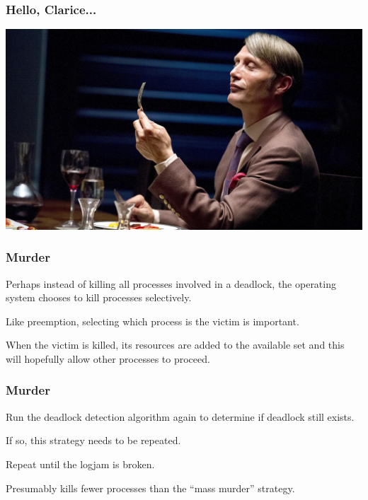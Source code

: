\begin{frame}
	\frametitle{Hello, Clarice...}

	\begin{center}
		\includegraphics[width=\textwidth]{images/mikkelsen.jpg}
	\end{center}

\end{frame}


\begin{frame}
	\frametitle{Murder}

	Perhaps instead of killing all processes involved in a deadlock, the operating system chooses to kill processes selectively.

	Like preemption, selecting which process is the victim is important.

	When the victim is killed, its resources are added to the available set and this will hopefully allow other processes to proceed.

\end{frame}

\begin{frame}
	\frametitle{Murder}
	Run the deadlock detection algorithm again to determine if deadlock still exists.

	If so, this strategy needs to be repeated.

	Repeat until the logjam is broken.

	Presumably kills fewer processes than the ``mass murder'' strategy.

\end{frame}


